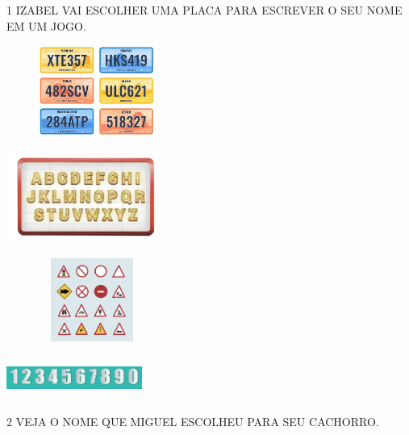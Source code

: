\blankpage



\pagebreak

\num{1} IZABEL VAI ESCOLHER UMA PLACA PARA ESCREVER O SEU NOME EM UM JOGO.

\begin{escolha}
\item \includegraphics[width=2.32569in,height=1.18472in]{media/image222.jpg}

\item \includegraphics[width=2.03125in,height=1.17361in]{media/image223.png}

\item \includegraphics[width=2.20764in,height=1.07569in]{media/image224.png}

\item \includegraphics[width=1.75000in,height=0.54792in]{media/image225.jpg}
\end{escolha}

\num{2} VEJA O NOME QUE MIGUEL ESCOLHEU PARA SEU CACHORRO. 

